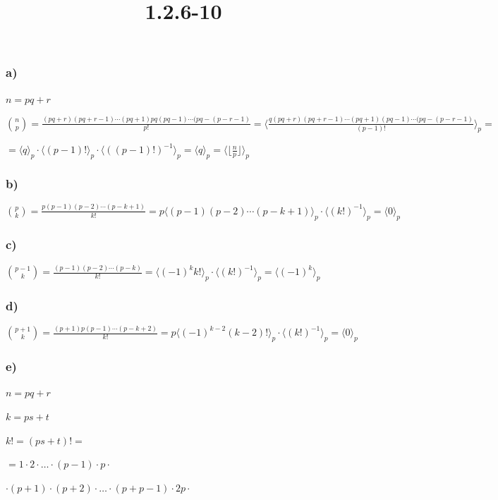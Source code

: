 \documentclass{article}
\title{1.2.6-10}
\begin{document}
\maketitle

\subsubsection*{a)}

$n = pq + r$

$\binom{n}{p} = \frac{(pq+r)(pq+r-1)\cdots(pq+1)pq(pq-1)\cdots(pq-(p-r-1)}{p!} = \langle\frac{q(pq+r)(pq+r-1)\cdots(pq+1)(pq-1)\cdots(pq-(p-r-1)}{(p-1)!}\rangle_p =$

$= \langle q \rangle_p \cdot \langle(p-1)!\rangle_p \cdot \langle((p-1)!)^{-1}\rangle_p = \langle q \rangle_p = \langle \lfloor\frac{n}{p}\rfloor \rangle_p$

\subsubsection*{b)}

$\binom{p}{k} = \frac{p(p-1)(p-2)\cdots(p-k+1)}{k!} = p\langle(p-1)(p-2)\cdots(p-k+1)\rangle_p \cdot \langle(k!)^{-1}\rangle_p = \langle 0 \rangle_p$

\subsubsection*{c)}

$\binom{p-1}{k} = \frac{(p-1)(p-2)\cdots(p-k)}{k!} = \langle(-1)^k k!\rangle_p \cdot \langle(k!)^{-1}\rangle_p = \langle(-1)^k \rangle_p$

\subsubsection*{d)}

$\binom{p+1}{k} = \frac{(p+1)p(p-1)\cdots(p-k+2)}{k!} = p\langle(-1)^{k-2}(k-2)!\rangle_p \cdot \langle(k!)^{-1}\rangle_p = \langle 0 \rangle_p$

\subsubsection*{e)}

$n = pq + r$

$k = ps + t$

$k! = (ps+t)! =$

$= 1 \cdot 2 \cdot \ldots \cdot (p-1) \cdot p \cdot$

$\cdot (p+1) \cdot (p+2) \cdot \ldots \cdot (p + p-1) \cdot 2p \cdot$
\end{document}
